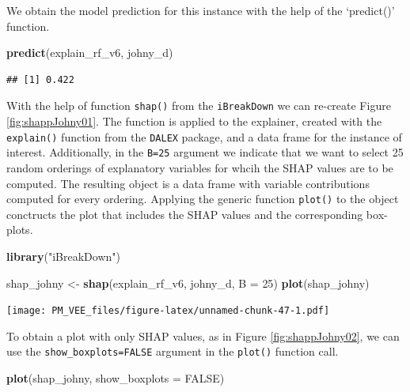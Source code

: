 \documentclass[12pt,]{krantz}
\newenvironment{Shaded}{\begin{snugshade}}{\end{snugshade}}
\newcommand{\DataTypeTok}[1]{\textcolor[rgb]{0.13,0.29,0.53}{#1}}
\newcommand{\DecValTok}[1]{\textcolor[rgb]{0.00,0.00,0.81}{#1}}
\newcommand{\KeywordTok}[1]{\textcolor[rgb]{0.13,0.29,0.53}{\textbf{#1}}}
\newcommand{\NormalTok}[1]{#1}
\newcommand{\OtherTok}[1]{\textcolor[rgb]{0.56,0.35,0.01}{#1}}
\newcommand{\StringTok}[1]{\textcolor[rgb]{0.31,0.60,0.02}{#1}}
\begin{document}
We obtain the model prediction for this instance with the help of the `predict()' function.

\begin{Shaded}
\begin{Highlighting}[]
\KeywordTok{predict}\NormalTok{(explain_rf_v6, johny_d)}
\end{Highlighting}
\end{Shaded}

\begin{verbatim}
## [1] 0.422
\end{verbatim}

With the help of function \texttt{shap()} from the \texttt{iBreakDown} we can re-create Figure \ref{fig:shappJohny01}. The function is applied to the explainer, created with the \texttt{explain()} function from the \texttt{DALEX} package, and a data frame for the instance of interest. Additionally, in the \texttt{B=25} argument we indicate that we want to select 25 random orderings of explanatory variables for whcih the SHAP values are to be computed. The resulting object is a data frame with variable contributions computed for every ordering. Applying the generic function \texttt{plot()} to the object conctructs the plot that includes the SHAP values and the corresponding box-plots.

\begin{Shaded}
\begin{Highlighting}[]
\KeywordTok{library}\NormalTok{(}\StringTok{"iBreakDown"}\NormalTok{)}

\NormalTok{shap_johny <-}\StringTok{ }\KeywordTok{shap}\NormalTok{(explain_rf_v6, johny_d, }\DataTypeTok{B =} \DecValTok{25}\NormalTok{)}
\KeywordTok{plot}\NormalTok{(shap_johny) }
\end{Highlighting}
\end{Shaded}

\texttt{[image: PM\_VEE\_files/figure-latex/unnamed-chunk-47-1.pdf]}

To obtain a plot with only SHAP values, as in Figure \ref{fig:shappJohny02}, we can use the \texttt{show\_boxplots=FALSE} argument in the \texttt{plot()} function call.

\begin{Shaded}
\begin{Highlighting}[]
\KeywordTok{plot}\NormalTok{(shap_johny, }\DataTypeTok{show_boxplots =} \OtherTok{FALSE}\NormalTok{) }
\end{Highlighting}
\end{Shaded}
\end{document}
